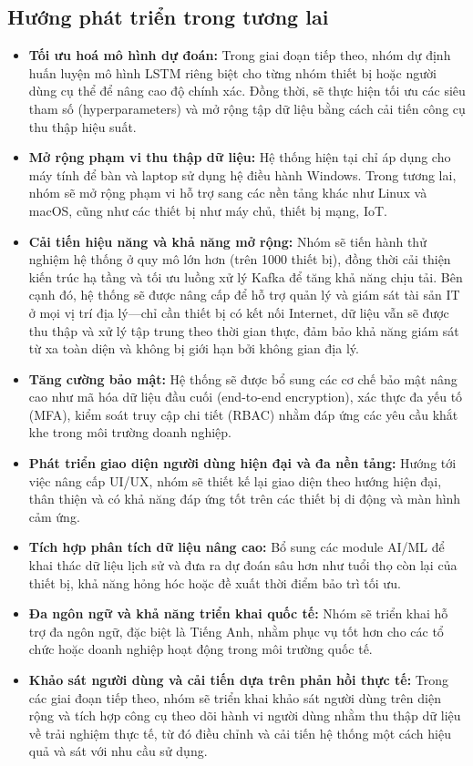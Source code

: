 \subsection{Hướng phát triển trong tương lai}
\begin{itemize}[label=--]
\item \textbf{Tối ưu hoá mô hình dự đoán:} Trong giai đoạn tiếp theo, nhóm dự định huấn luyện mô hình LSTM riêng biệt cho từng nhóm thiết bị hoặc người dùng cụ thể để nâng cao độ chính xác. Đồng thời, sẽ thực hiện tối ưu các siêu tham số (hyperparameters) và mở rộng tập dữ liệu bằng cách cải tiến công cụ thu thập hiệu suất.
   \item \textbf{Mở rộng phạm vi thu thập dữ liệu:} Hệ thống hiện tại chỉ áp dụng cho máy tính để bàn và laptop sử dụng hệ điều hành Windows. Trong tương lai, nhóm sẽ mở rộng phạm vi hỗ trợ sang các nền tảng khác như Linux và macOS, cũng như các thiết bị như máy chủ, thiết bị mạng, IoT.

\item \textbf{Cải tiến hiệu năng và khả năng mở rộng:} Nhóm sẽ tiến hành thử nghiệm hệ thống ở quy mô lớn hơn (trên 1000 thiết bị), đồng thời cải thiện kiến trúc hạ tầng và tối ưu luồng xử lý Kafka để tăng khả năng chịu tải. Bên cạnh đó, hệ thống sẽ được nâng cấp để hỗ trợ quản lý và giám sát tài sản IT ở mọi vị trí địa lý—chỉ cần thiết bị có kết nối Internet, dữ liệu vẫn sẽ được thu thập và xử lý tập trung theo thời gian thực, đảm bảo khả năng giám sát từ xa toàn diện và không bị giới hạn bởi không gian địa lý.

\item \textbf{Tăng cường bảo mật:} Hệ thống sẽ được bổ sung các cơ chế bảo mật nâng cao như mã hóa dữ liệu đầu cuối (end-to-end encryption), xác thực đa yếu tố (MFA), kiểm soát truy cập chi tiết (RBAC) nhằm đáp ứng các yêu cầu khắt khe trong môi trường doanh nghiệp.

\item \textbf{Phát triển giao diện người dùng hiện đại và đa nền tảng:} Hướng tới việc nâng cấp UI/UX, nhóm sẽ thiết kế lại giao diện theo hướng hiện đại, thân thiện và có khả năng đáp ứng tốt trên các thiết bị di động và màn hình cảm ứng.

\item \textbf{Tích hợp phân tích dữ liệu nâng cao:} Bổ sung các module AI/ML để khai thác dữ liệu lịch sử và đưa ra dự đoán sâu hơn như tuổi thọ còn lại của thiết bị, khả năng hỏng hóc hoặc đề xuất thời điểm bảo trì tối ưu.

\item \textbf{Đa ngôn ngữ và khả năng triển khai quốc tế:} Nhóm sẽ triển khai hỗ trợ đa ngôn ngữ, đặc biệt là Tiếng Anh, nhằm phục vụ tốt hơn cho các tổ chức hoặc doanh nghiệp hoạt động trong môi trường quốc tế.

\item \textbf{Khảo sát người dùng và cải tiến dựa trên phản hồi thực tế:} Trong các giai đoạn tiếp theo, nhóm sẽ triển khai khảo sát người dùng trên diện rộng và tích hợp công cụ theo dõi hành vi người dùng nhằm thu thập dữ liệu về trải nghiệm thực tế, từ đó điều chỉnh và cải tiến hệ thống một cách hiệu quả và sát với nhu cầu sử dụng.

\end{itemize}

